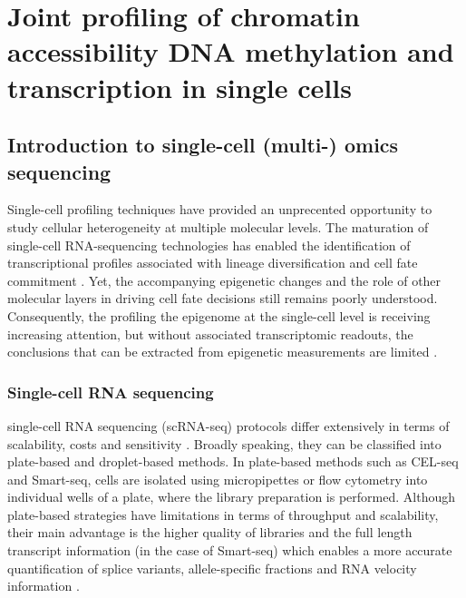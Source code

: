\graphicspath{{Chapter1/Figs/}}

\chapter{Joint profiling of chromatin accessibility DNA methylation and transcription in single cells}

\section{Introduction to single-cell (multi-) omics sequencing}

Single-cell profiling techniques have provided an unprecented opportunity to study cellular heterogeneity at multiple molecular levels. The maturation of single-cell RNA-sequencing technologies has enabled the identification of transcriptional profiles associated with lineage diversification and cell fate commitment \cite{Kolodziejczyk2015,Griffiths2018,Papalexi2017,Patel2014}. Yet, the accompanying epigenetic changes and the role of other molecular layers in driving cell fate decisions still remains poorly understood. Consequently, the profiling the epigenome at the single-cell level is receiving increasing attention, but without associated transcriptomic readouts, the conclusions that can be extracted from epigenetic measurements are limited \cite{Stuart2019,Kelsey2017,Griffiths2018}.

\subsection{Single-cell RNA sequencing} \label{section:rna_expresssion}

single-cell RNA sequencing (scRNA-seq) protocols differ extensively in terms of scalability, costs and sensitivity \cite{Svensson2018, Lafzi2018}. Broadly speaking, they can be classified into plate-based and droplet-based methods. In plate-based methods such as CEL-seq \cite{Hashimshony2012} and Smart-seq\cite{Ramskold2012, Picelli2014}, cells are isolated using micropipettes or flow cytometry into individual wells of a plate, where the library preparation is performed. Although plate-based strategies have limitations in terms of throughput and scalability, their main advantage is the higher quality of libraries and the full length transcript information (in the case of Smart-seq) which enables a more accurate quantification of splice variants\cite{Huang2017}, allele-specific fractions\cite{Deng2014} and RNA velocity information \cite{LaManno2018}.
	

